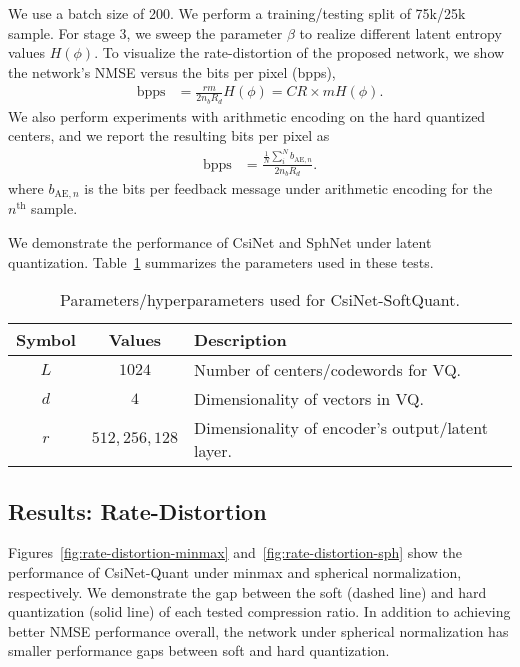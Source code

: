 We use a batch size of 200. We perform a training/testing split of 75k/25k sample. For stage 3, we sweep the parameter $\beta$ to realize different latent entropy values $H(\phi)$. To visualize the rate-distortion of the proposed network, we show the network's NMSE versus the bits per pixel (bpps), 
\begin{align*}
	\text{bpps}	 &= \frac{rm}{2 n_{b}R_{d}}H(\phi) = CR\times mH(\phi). %
\end{align*}
We also perform experiments with arithmetic encoding on the hard quantized centers, and we report the resulting bits per pixel as
\begin{align*}
	\text{bpps}	 &= \frac{\frac 1N \sum_{i}^N b_{\text{AE},n}}{2 n_{b}R_{d}}. %
\end{align*}
where $b_{\text{AE},n}$ is the bits per feedback message under arithmetic encoding for the $n^{\text{th}}$ sample.

We demonstrate the performance of CsiNet and SphNet under latent quantization. Table~\ref{tab:quant-params} summarizes the parameters used in these tests. %

\begin{table}[]
\centering
\caption{Parameters/hyperparameters used for CsiNet-SoftQuant.}
\label{tab:quant-params}
\begin{tabular}{c|c|l}
\toprule
\textbf{Symbol}   & \textbf{Values}  & \textbf{Description} \\ \midrule
$L$ 		  	  & $1024$	 		 & Number of centers/codewords for VQ.  \\ \hline
$d$               & $4$				 & Dimensionality of vectors in VQ.  \\ \hline
$r$               & $512,256,128$	 & Dimensionality of encoder's output/latent layer.  \\ \hline
\end{tabular}
\end{table}

\subsection{Results: Rate-Distortion} \label{sec:results-rate-distortion}

Figures~\ref{fig:rate-distortion-minmax} and~\ref{fig:rate-distortion-sph} show the performance of CsiNet-Quant under minmax and spherical normalization, respectively. We demonstrate the gap between the soft (dashed line) and hard quantization (solid line) of each tested compression ratio. In addition to achieving better NMSE performance overall, the network under spherical normalization has smaller performance gaps between soft and hard quantization.

